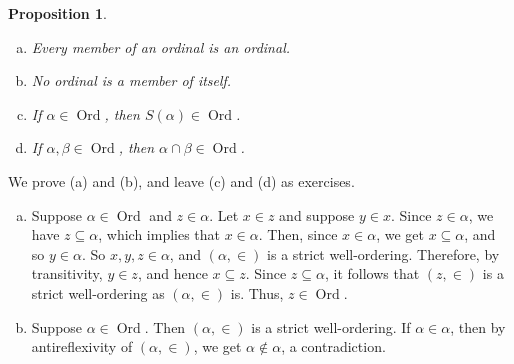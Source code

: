 \documentclass[10pt]{article}
\makeatletter
\DeclareMathOperator{\Ord}{Ord}
\theoremstyle{newstyle}
\newtheorem{prop}[thm]{Proposition}
\newenvironment{pf}[1][\proofname]{\par
  \pushQED{\qed}%
  \normalfont \topsep0\p@\relax
  \trivlist
  \item[\hskip\labelsep\scshape
  #1\@addpunct{.}]\ignorespaces
}{%
  \popQED\endtrivlist\@endpefalse
}
\makeatother
\begin{document}
\begin{prop}~ 
\begin{enumerate}[(a)]
    \item Every member of an ordinal is an ordinal.
    \item No ordinal is a member of itself.
    \item If $\alpha \in \Ord$, then $S(\alpha) \in \Ord$.
    \item If $\alpha, \beta \in \Ord$, then $\alpha \cap \beta \in \Ord$.
\end{enumerate} 
\end{prop}
\begin{pf} 
We prove (a) and (b), and leave (c) and (d) as exercises. 
\begin{enumerate}[(a)]
    \item Suppose $\alpha \in \Ord$ and $z \in \alpha$. Let $x \in z$ and suppose $y \in x$. 
    Since $z \in \alpha$, we have $z \subseteq \alpha$, which implies that $x \in \alpha$. 
    Then, since $x \in \alpha$, we get $x \subseteq \alpha$, and so $y \in \alpha$. 
    So $x, y, z \in \alpha$, and $(\alpha, \in)$ is a strict well-ordering. Therefore, 
    by transitivity, $y \in z$, and hence $x \subseteq z$. Since $z \subseteq \alpha$, 
    it follows that $(z, \in)$ is a strict well-ordering as $(\alpha, \in)$ is. 
    Thus, $z \in \Ord$. 
    \item Suppose $\alpha \in \Ord$. Then $(\alpha, \in)$ is a strict well-ordering. 
    If $\alpha \in \alpha$, then by antireflexivity of $(\alpha, \in)$, we get 
    $\alpha \notin \alpha$, a contradiction. \qedhere
\end{enumerate} 
\end{pf}
\end{document}
